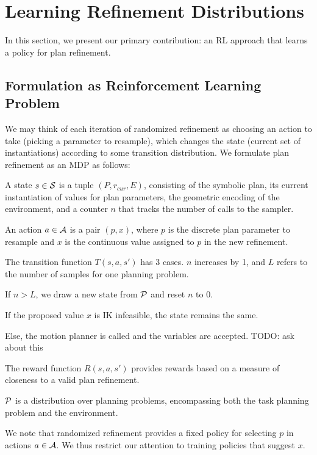 \section{Learning Refinement Distributions}
In this section, we present our primary contribution: an RL
approach that learns a policy for plan refinement.

\subsection{Formulation as Reinforcement Learning Problem}
We may think of each iteration of randomized refinement as choosing an action to take
(picking a parameter to resample), which changes the state (current set of instantiations)
according to some transition distribution. We formulate plan refinement as an MDP as follows:
\begin{tightlist}
\item A state $s \in \mathcal{S}$ is a tuple $(P, r_{cur}, E)$, consisting of the
symbolic plan, its current instantiation of values for plan parameters,
the geometric encoding of the environment, and a counter $n$ that tracks
the number of calls to the sampler.
\item An action $a \in \mathcal{A}$ is a pair $(p, x)$, where $p$ is the discrete plan
parameter to resample and $x$ is the continuous value assigned to $p$ in the new refinement.
\item The transition function $T(s, a, s')$ has 3 cases. $n$ increases by 1, and $L$ refers to
the number of samples for one planning problem.
  \begin{tightlist}
  \item If $n > L$, we draw a new state from $\mathcal{P}$ and reset $n$ to 0.
  \item If the proposed value $x$ is IK infeasible, the state remains the same.
  \item Else, the motion planner is called and the variables are accepted. TODO: ask about this
  \end{tightlist}
\item The reward function $R(s, a, s')$ provides rewards based on a measure of closeness to a valid plan refinement.
\item $\mathcal{P}$ is a distribution over planning problems, encompassing both the task planning problem
and the environment.
\end{tightlist}

We note that randomized refinement provides a fixed policy for selecting $p$ in actions $a \in \mathcal{A}$.
We thus restrict our attention to training policies that suggest $x$.

